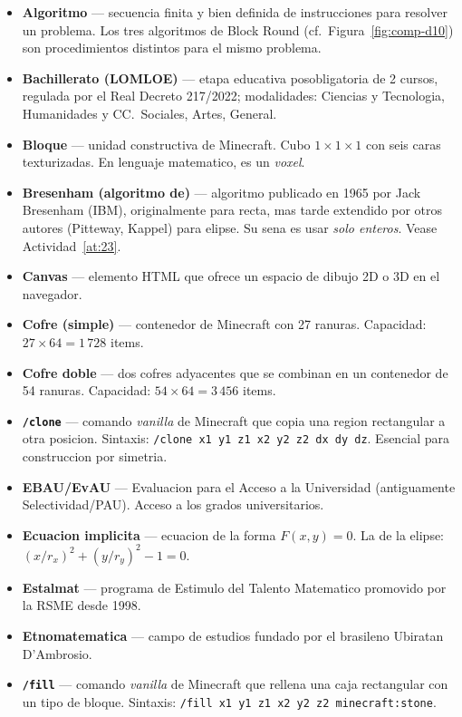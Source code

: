 \documentclass[12pt,a4paper]{scrartcl}
\newcommand{\code}[1]{\texttt{\small #1}}
\newcommand{\acc}[1]{\textcolor{accent}{\textbf{#1}}}
\newcommand{\cmd}[1]{\textcolor{earth}{\texttt{\small #1}}}
\begin{document}
\begin{itemize}[leftmargin=1.4em,itemsep=0.3em,topsep=0.3em]
  \item \acc{Algoritmo} --- secuencia finita y bien definida de instrucciones para resolver un problema. Los tres algoritmos de Block Round (cf.\ Figura~\ref{fig:comp-d10}) son procedimientos distintos para el mismo problema.
  \item \acc{Bachillerato (LOMLOE)} --- etapa educativa posobligatoria de 2 cursos, regulada por el Real Decreto 217/2022; modalidades: Ciencias y Tecnologia, Humanidades y CC.\ Sociales, Artes, General.
  \item \acc{Bloque} --- unidad constructiva de Minecraft. Cubo $1\times1\times1$ con seis caras texturizadas. En lenguaje matematico, es un \emph{voxel}.
  \item \acc{Bresenham (algoritmo de)} --- algoritmo publicado en 1965 por Jack Bresenham (IBM), originalmente para recta, mas tarde extendido por otros autores (Pitteway, Kappel) para elipse. Su sena es usar \emph{solo enteros}. Vease Actividad~\ref{at:23}.
  \item \acc{Canvas} --- elemento HTML que ofrece un espacio de dibujo 2D o 3D en el navegador.
  \item \acc{Cofre (simple)} --- contenedor de Minecraft con 27 ranuras. Capacidad: $27 \times 64 = 1\,728$ items.
  \item \acc{Cofre doble} --- dos cofres adyacentes que se combinan en un contenedor de 54 ranuras. Capacidad: $54 \times 64 = 3\,456$ items.
  \item \acc{\code{/clone}} --- comando \emph{vanilla} de Minecraft que copia una region rectangular a otra posicion. Sintaxis: \cmd{/clone x1 y1 z1 x2 y2 z2 dx dy dz}. Esencial para construccion por simetria.
  \item \acc{EBAU/EvAU} --- Evaluacion para el Acceso a la Universidad (antiguamente Selectividad/PAU). Acceso a los grados universitarios.
  \item \acc{Ecuacion implicita} --- ecuacion de la forma $F(x, y) = 0$. La de la elipse: $(x/r_x)^2 + (y/r_y)^2 - 1 = 0$.
  \item \acc{Estalmat} --- programa de Estimulo del Talento Matematico promovido por la RSME desde 1998.
  \item \acc{Etnomatematica} --- campo de estudios fundado por el brasileno Ubiratan D'Ambrosio.
  \item \acc{\code{/fill}} --- comando \emph{vanilla} de Minecraft que rellena una caja rectangular con un tipo de bloque. Sintaxis: \cmd{/fill x1 y1 z1 x2 y2 z2 minecraft:stone}.

\end{itemize}
\end{document}
